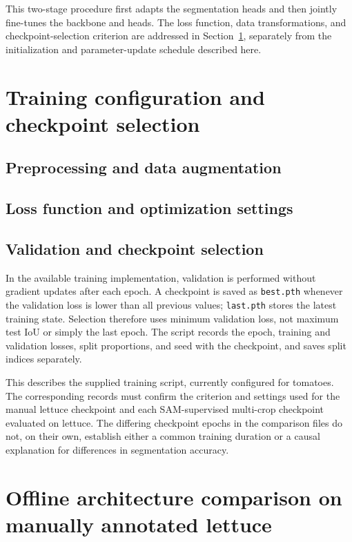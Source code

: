 This two-stage procedure first adapts the segmentation heads and then
jointly fine-tunes the backbone and heads. The loss function, data
transformations, and checkpoint-selection criterion are addressed in
Section~\ref{sec:c3_training}, separately from the initialization and
parameter-update schedule described here.

\section{Training configuration and checkpoint selection}
\label{sec:c3_training}

\subsection{Preprocessing and data augmentation}
\label{subsec:c3_preprocessing}

\subsection{Loss function and optimization settings}
\label{subsec:c3_loss_optimization}

\subsection{Validation and checkpoint selection}
\label{subsec:c3_checkpoint_selection}

In the available training implementation, validation is performed without
gradient updates after each epoch. A checkpoint is saved as
\texttt{best.pth} whenever the validation loss is lower than all previous
values; \texttt{last.pth} stores the latest training state. Selection
therefore uses minimum validation loss, not maximum test IoU or simply
the last epoch. The script records the epoch, training and validation
losses, split proportions, and seed with the checkpoint, and saves split
indices separately.

This describes the supplied training script, currently configured for
tomatoes. The corresponding records must confirm the criterion and
settings used for the manual lettuce checkpoint and each SAM-supervised
multi-crop checkpoint evaluated on lettuce.
The differing checkpoint epochs in the comparison files do not, on their
own, establish either a common training duration or a causal explanation
for differences in segmentation accuracy.

\section{Offline architecture comparison on manually annotated lettuce}
\label{sec:c3_architecture_comparison}

